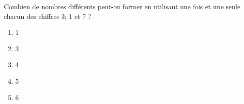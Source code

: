 Combien de nombres différents peut-on former en utilisant une fois et
une seule chacun des chiffres 3; 1 et 7 ?
\begin{multicols}{5}
  \begin{enumerate}[A/]
  \item 1
  \item 3
  \item 4
  \item 5
  \item 6
  \end{enumerate}
\end{multicols}